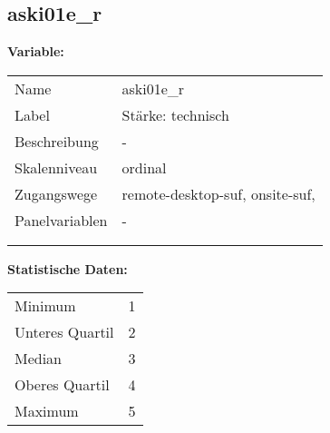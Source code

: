 	
	
	\subsection{aski01e\_r}
	\label{subSection:aski01e_r}

	\noindent\textbf{Variable:}\\
		\begin{tabular}{lL{11.3cm}}
			\label{tableVariable:aski01e_r}
			Name & aski01e\_r \\
			Label & Stärke: technisch \\
			Beschreibung & - \\
			Skalenniveau & ordinal \\
			Zugangswege &
				remote-desktop-suf,
				onsite-suf,
 \\
			Panelvariablen & -
			 \\
			 \\
 \\
		\end{tabular}



		\vspace*{1 cm}
		\noindent\textbf{Statistische Daten:}\\
			\begin{tabular}{ll}
				\label{tableStatistics:aski01e_r}
					Minimum & 1 \\
					Unteres Quartil & 2 \\
					Median & 3 \\
					Oberes Quartil & 4 \\
					Maximum & 5 \\
			\end{tabular}



